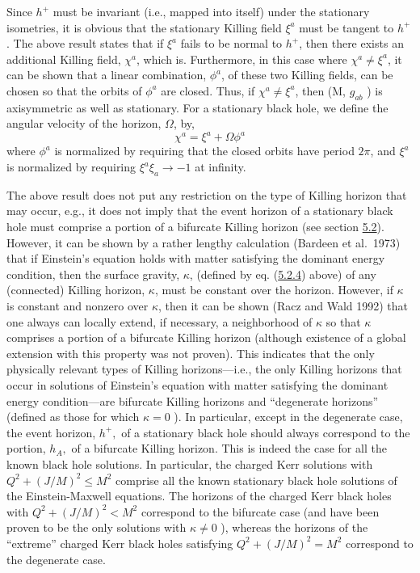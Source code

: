 \documentclass[11pt,a4paper]{article}
\begin{document}
Since \(h^+\) must be invariant (i.e., mapped into itself) under the stationary isometries, it is obvious that the stationary Killing field \(\xi^a\) must be tangent to \(h^+\). The above result states that if \(\xi^a\) fails to be normal to \(h^+\), then there exists an additional Killing field, \(\chi^a\), which is. Furthermore, in this case where \(\chi^a \neq \xi^a\), it can be shown that a linear combination, \(\phi^a\), of these two Killing fields, can be chosen so that the orbits of \(\phi^a\) are closed. Thus, if \(\chi^a \neq \xi^a\), then (M, \(g_{ab}\) ) is axisymmetric as well as stationary. For a stationary black hole, we define the angular velocity of the horizon, \(\Omega\), by,
\begin{equation*}
\chi^{a} = \xi^{a} + \Omega \phi^{a} \tag{6.2.1}\label{eq:6.2.1}
\end{equation*}
where \(\phi^a\) is normalized by requiring that the closed orbits have period \(2\pi\), and \(\xi^a\) is normalized by requiring \(\xi^a\xi_a\to -1\) at infinity.

The above result does not put any restriction on the type of Killing horizon that may occur, e.g., it does not imply that the event horizon of a stationary black hole must comprise a portion of a bifurcate Killing horizon (see section \hyperlink{sec:5.2}{5.2}). However, it can be shown by a rather lengthy calculation (Bardeen et al.~1973) that if Einstein's equation holds with matter satisfying the dominant energy condition, then the surface gravity, \(\kappa\), (defined by eq. (\hyperref[eq:5.2.4]{5.2.4}) above) of any (connected) Killing horizon, \(\kappa\), must be constant over the horizon. However, if \(\kappa\) is constant and nonzero over \(\kappa\), then it can be shown (Racz and Wald 1992) that one always can locally extend, if necessary, a neighborhood of \(\kappa\) so that \(\kappa\) comprises a portion of a bifurcate Killing horizon (although existence of a global extension with this property was not proven). This indicates that the only physically relevant types of Killing horizons---i.e., the only Killing \hypertarget{source-154}{} horizons that occur in solutions of Einstein's equation with matter satisfying the dominant energy condition---are bifurcate Killing horizons and ``degenerate horizons'' (defined as those for which \(\kappa=0\) ). In particular, except in the degenerate case, the event horizon, \(h^+,\) of a stationary black hole should always correspond to the portion, \(h_A,\) of a bifurcate Killing horizon. This is indeed the case for all the known black hole solutions. In particular, the charged Kerr solutions with \(Q^2+(J/M)^2 \le M^2\) comprise all the known stationary black hole solutions of the Einstein-Maxwell equations. The horizons of the charged Kerr black holes with \(Q^2+(J/M)^2 < M^2\) correspond to the bifurcate case (and have been proven to be the only solutions with \(\kappa \neq 0\) ), whereas the horizons of the ``extreme'' charged Kerr black holes satisfying \(Q^2+(J/M)^2=M^2\) correspond to the degenerate case.
\end{document}
